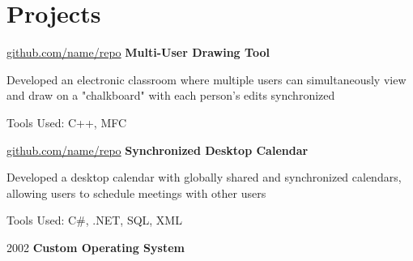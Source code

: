 \documentclass{resume}
\begin{document}
    
    \section{Projects}



        
        \begin{twocolentry}{
            \href{https://github.com/sinaatalay/rendercv}{github.com/name/repo}
        }
            \textbf{Multi-User Drawing Tool}\end{twocolentry}

        \vspace{0.10 cm}
        \begin{onecolentry}
            \begin{highlights}
                \item Developed an electronic classroom where multiple users can simultaneously view and draw on a "chalkboard" with each person's edits synchronized
                \item Tools Used: C++, MFC
            \end{highlights}
        \end{onecolentry}


        \vspace{0.2 cm}

        \begin{twocolentry}{
            \href{https://github.com/sinaatalay/rendercv}{github.com/name/repo}
        }
            \textbf{Synchronized Desktop Calendar}\end{twocolentry}

        \vspace{0.10 cm}
        \begin{onecolentry}
            \begin{highlights}
                \item Developed a desktop calendar with globally shared and synchronized calendars, allowing users to schedule meetings with other users
                \item Tools Used: C\#, .NET, SQL, XML
            \end{highlights}
        \end{onecolentry}


        \vspace{0.2 cm}

        \begin{twocolentry}{
            2002
        }
            \textbf{Custom Operating System}\end{twocolentry}
\end{document}
